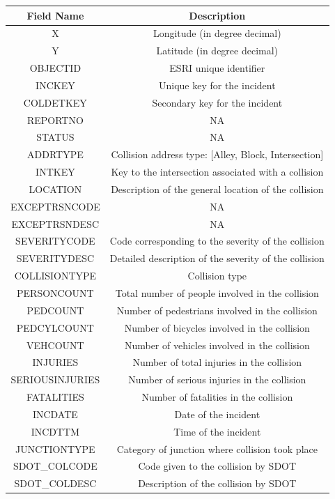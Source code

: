 \documentclass{article}
\begin{document}
\begin{table}
  \centering
  \begin{tabular}{|c | c|}
  \hline
  Field Name & Description\\
  \hline
  X & Longitude (in degree decimal)\\
  Y & Latitude (in degree decimal)\\
  OBJECTID & ESRI unique identifier\\
  INCKEY & Unique key for the incident\\
  COLDETKEY & Secondary key for the incident\\
  REPORTNO & NA\\
  STATUS & NA\\
  ADDRTYPE & Collision address type: [Alley, Block, Intersection]\\
  INTKEY & Key to the intersection associated with a collision \\
  LOCATION & Description of the general location of the collision \\
  EXCEPTRSNCODE & NA\\
  EXCEPTRSNDESC & NA\\
  SEVERITYCODE & Code corresponding to the severity of the collision\\
  SEVERITYDESC & Detailed description of the severity of the collision\\
  COLLISIONTYPE & Collision type\\
  PERSONCOUNT & Total number of people involved in the collision\\
  PEDCOUNT & Number of pedestrians involved in the collision\\
  PEDCYLCOUNT & Number of bicycles involved in the collision\\
  VEHCOUNT & Number of vehicles involved in the collision\\
  INJURIES & Number of total injuries in the collision\\
  SERIOUSINJURIES & Number of serious injuries in the collision\\
  FATALITIES & Number of fatalities in the collision\\
  INCDATE & Date of the incident\\
  INCDTTM & Time of the incident\\
  JUNCTIONTYPE & Category of junction where collision took place\\
  SDOT\_COLCODE & Code given to the collision by SDOT\\
  SDOT\_COLDESC & Description of the collision by SDOT\\

\end{tabular}
\end{table}
\end{document}
